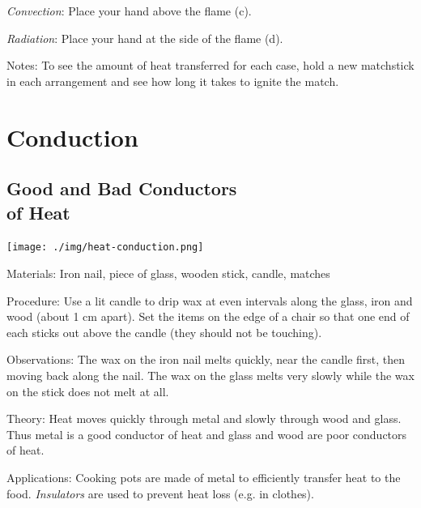 \begin{multicols}{2}
\begin{description*}
{\emph{Convection}: Place your hand above the flame (c). 

\emph{Radiation}: Place your hand at the side of the flame (d).}
\item[Notes:]{To see the amount of heat transferred for each case, hold a new matchstick in each arrangement and see how long it takes to ignite the match.}
\end{description*}

\vfill
\columnbreak


\section*{Conduction}


\subsection[Good and Bad Conductors of Heat]{Good and Bad Conductors \hfill \\ of Heat}

\begin{center}
\texttt{[image: ./img/heat-conduction.png]}
\end{center}

\begin{description*}
\item[Materials:]{Iron nail, piece of glass, wooden stick, candle, matches}
\item[Procedure:]{Use a lit candle to drip wax at even intervals along the glass, iron and wood (about 1 cm apart). Set the items on the edge of a chair so that one end of each sticks out above the candle (they should not be touching).}
\item[Observations:]{The wax on the iron nail melts quickly, near the candle first, then moving back along the nail. The wax on the glass melts very slowly while the wax on the stick does not melt at all.}
\item[Theory:]{Heat moves quickly through metal and slowly through wood and glass. Thus metal is a good conductor of heat and glass and wood are poor conductors of heat.}
\item[Applications:]{Cooking pots are made of metal to efficiently transfer heat to the food. \emph{Insulators} are used to prevent heat loss (e.g. in clothes).}
\end{description*}


\end{multicols}
